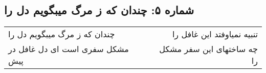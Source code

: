 \begin{center}
\section*{شماره ۵: چندان که ز مرگ میبگویم دل را}
\label{sec:005}
\begin{longtable}{l p{0.5cm} r}
چندان که ز مرگ میبگویم دل را
&&
تنبیه نمیاوفتد این غافل را
\\
مشکل سفری است ای دل غافل در پیش
&&
چه ساختهای این سفر مشکل را
\\
\end{longtable}
\end{center}

